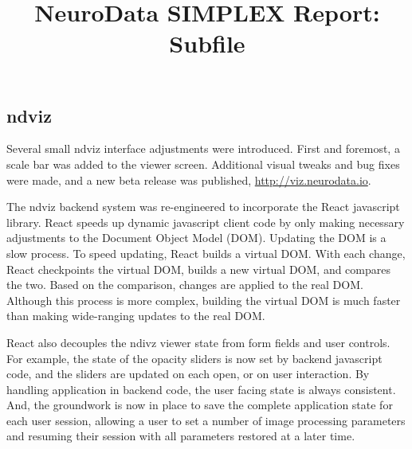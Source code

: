 \documentclass[simplex.tex]{subfiles}
\title{NeuroData SIMPLEX Report: Subfile}
\begin{document}


\subsection{ndviz}

Several small ndviz interface adjustments were introduced. First and
foremost, a scale bar was added to the viewer screen. Additional visual
tweaks and bug fixes were made, and a new beta release was
published, \href{http://viz.neurodata.io}{http://viz.neurodata.io}.

The ndviz backend system was re-engineered to incorporate the React javascript library. React speeds up dynamic javascript client code by only making necessary adjustments to the Document Object Model (DOM). Updating the DOM is a slow process. To speed updating, React builds a virtual DOM. With each change, React checkpoints the virtual DOM, builds a new virtual DOM, and compares the two. Based on the comparison, changes are applied to the real DOM. Although this process is more complex, building the virtual DOM is much faster than making wide-ranging updates to the real DOM. 


React also decouples the ndivz viewer state from form fields and user controls. For example, the state of the opacity sliders is now set by backend javascript code, and the sliders are updated on each open, or on user interaction. By handling application in backend code, the user facing state is always consistent. And, the groundwork is now in place to save the complete application state for each user session, allowing a user to set a number of image processing parameters and resuming their session with all parameters restored at a later time. 
\end{document}
